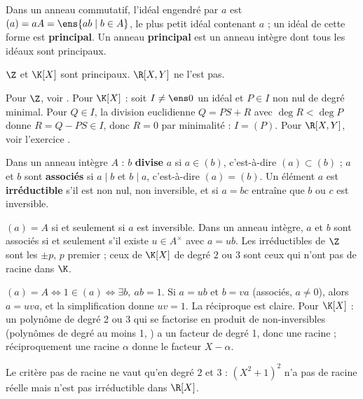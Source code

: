 \begin{definition}
Dans un anneau commutatif, l'idéal engendré par $a$ est $(a)=aA=\ens{ab\mid b\in A}$, le plus petit idéal contenant $a$ ; un idéal de cette forme est \textbf{principal}. Un anneau \textbf{principal} est un anneau intègre dont tous les idéaux sont principaux.
\end{definition}
\begin{theoreme}\label{thm-principaux}
$\Z$ et $\K[X]$ sont principaux. $\R[X,Y]$ ne l'est pas.
\end{theoreme}
\begin{preuve}
Pour $\Z$, voir . Pour $\K[X]$ : soit $I\neq\ens0$ un idéal et $P\in I$ non nul de degré minimal. Pour $Q\in I$, la division euclidienne $Q=PS+R$ avec $\deg R<\deg P$ donne $R=Q-PS\in I$, donc $R=0$ par minimalité : $I=(P)$. Pour $\R[X,Y]$, voir l'exercice .
\end{preuve}
\begin{definition}[Divisibilité]
Dans un anneau intègre $A$ : $b$ \textbf{divise} $a$ si $a\in(b)$, c'est-à-dire $(a)\subset(b)$ ; $a$ et $b$ sont \textbf{associés} si $a\mid b$ et $b\mid a$, c'est-à-dire $(a)=(b)$. Un élément $a$ est \textbf{irréductible} s'il est non nul, non inversible, et si $a=bc$ entraîne que $b$ ou $c$ est inversible.
\end{definition}
\begin{proposition}\label{prop-associes}
$(a)=A$ si et seulement si $a$ est inversible. Dans un anneau intègre, $a$ et $b$ sont associés si et seulement s'il existe $u\in A^\times$ avec $a=ub$. Les irréductibles de $\Z$ sont les $\pm p$, $p$ premier ; ceux de $\K[X]$ de degré $2$ ou $3$ sont ceux qui n'ont pas de racine dans $\K$.
\end{proposition}
\begin{preuve}
$(a)=A\iff1\in(a)\iff\exists b,\ ab=1$. Si $a=ub$ et $b=va$ (associés, $a\neq0$), alors $a=uva$, et la simplification donne $uv=1$. La réciproque est claire. Pour $\K[X]$ : un polynôme de degré 2 ou 3 qui se factorise en produit de non-inversibles (polynômes de degré au moins 1, ) a un facteur de degré 1, donc une racine ; réciproquement une racine $\alpha$ donne le facteur $X-\alpha$.
\end{preuve}
\begin{attention}
Le critère \og pas de racine \fg{} ne vaut qu'en degré $2$ et $3$ : $(X^2+1)^2$ n'a pas de racine réelle mais n'est pas irréductible dans $\R[X]$.
\end{attention}

